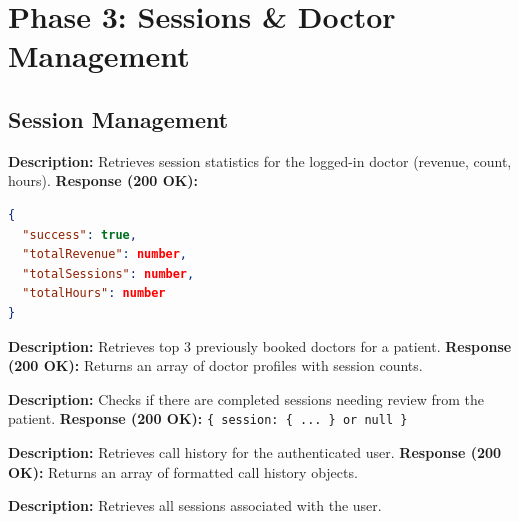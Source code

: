 \documentclass{article}
\begin{document}
\section{Phase 3: Sessions \& Doctor Management}

\subsection{Session Management}

\begin{tcolorbox}[title=\textcolor{accent}{GET} /api/sessions/stats]
\textbf{Description:} Retrieves session statistics for the logged-in doctor (revenue, count, hours).
\vspace{0.5em}
\textbf{Response (200 OK):}
\begin{lstlisting}[language=json]
{
  "success": true,
  "totalRevenue": number,
  "totalSessions": number,
  "totalHours": number
}
\end{lstlisting}
\end{tcolorbox}

\begin{tcolorbox}[title=\textcolor{accent}{GET} /api/sessions/my-doctors]
\textbf{Description:} Retrieves top 3 previously booked doctors for a patient.
\vspace{0.5em}
\textbf{Response (200 OK):} Returns an array of doctor profiles with session counts.
\end{tcolorbox}

\begin{tcolorbox}[title=\textcolor{accent}{GET} /api/sessions/pending-feedback]
\textbf{Description:} Checks if there are completed sessions needing review from the patient.
\vspace{0.5em}
\textbf{Response (200 OK):} \texttt{\{ session: \{ ... \} or null \}}
\end{tcolorbox}

\begin{tcolorbox}[title=\textcolor{accent}{GET} /api/sessions/call-history]
\textbf{Description:} Retrieves call history for the authenticated user.
\vspace{0.5em}
\textbf{Response (200 OK):} Returns an array of formatted call history objects.
\end{tcolorbox}

\begin{tcolorbox}[title=\textcolor{accent}{GET} /api/sessions/my-sessions]
\textbf{Description:} Retrieves all sessions associated with the user.
\end{tcolorbox}
\end{document}
